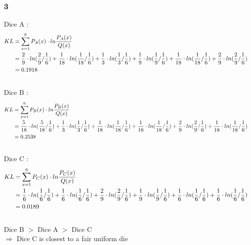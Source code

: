 \documentclass{article}
\begin{document}
\\[20pt]
\subsubsection*{3}
Dice A :
\begin{equation}\notag
\begin{aligned} 
KL & =  \sum\limits_{x=1}^{6}P_A(x)\cdot ln\frac{P_A(x)}{Q(x)}\\
&= \frac{2}{9}\cdot ln(\frac{2}{9}/\frac{1}{6})+\frac{1}{18}\cdot ln(\frac{1}{18}/\frac{1}{6})+\frac{1}{3}\cdot ln(\frac{1}{3}/\frac{1}{6})+\frac{1}{9}\cdot ln(\frac{1}{9}/\frac{1}{6})+\frac{1}{18}\cdot ln(\frac{1}{18}/\frac{1}{6})+\frac{2}{9}\cdot ln(\frac{2}{9}/\frac{1}{6})\\
&=0.1918
\end{aligned}
\end{equation}
\\
Dice B :
\begin{equation}\notag
\begin{aligned} 
KL & =  \sum\limits_{x=1}^{6}P_B(x)\cdot ln\frac{P_B(x)}{Q(x)}\\
&= \frac{5}{18}\cdot ln(\frac{5}{18}/\frac{1}{6})+\frac{1}{3}\cdot ln(\frac{1}{3}/\frac{1}{6})+\frac{1}{18}\cdot ln(\frac{1}{18}/\frac{1}{6})+\frac{1}{18}\cdot ln(\frac{1}{18}/\frac{1}{6})+\frac{2}{9}\cdot ln(\frac{2}{9}/\frac{1}{6})+\frac{1}{18}\cdot ln(\frac{1}{18}/\frac{1}{6})\\
&=0.2538
\end{aligned}
\end{equation}
\\
Dice C :
\begin{equation}\notag
\begin{aligned} 
KL & =  \sum\limits_{x=1}^{6}P_C(x)\cdot ln\frac{P_C(x)}{Q(x)}\\
&= \frac{1}{6}\cdot ln(\frac{1}{6}/\frac{1}{6})+\frac{1}{6}\cdot ln(\frac{1}{6}/\frac{1}{6})+\frac{2}{9}\cdot ln(\frac{2}{9}/\frac{1}{6})+\frac{1}{9}\cdot ln(\frac{1}{9}/\frac{1}{6})+\frac{1}{6}\cdot ln(\frac{1}{6}/\frac{1}{6})+\frac{1}{6}\cdot ln(\frac{1}{6}/\frac{1}{6})\\
&=0.0189
\end{aligned}
\end{equation}
\\
Dice B $>$ Dice A $>$ Dice C\\
$ \Rightarrow$ Dice C is closest to a fair uniform die
\newpage
\end{document}
